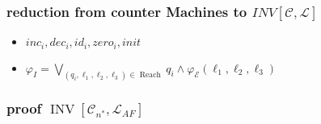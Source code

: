 \begin{frame}
    \frametitle{reduction from counter Machines to $INV[\mathcal{C},\mathcal{L}]$}
    \begin{itemize}
        \item $inc_i, dec_i, id_i, zero_i, init$
        \item $\varphi_{I}=\bigvee_{\left(q_{i}, \ell_{1}, \ell_{2}, \ell_{3}\right) \in \text { Reach }} q_{i} \wedge \varphi_{\mathcal{E}}\left(\ell_{1}, \ell_{2}, \ell_{3}\right) $
    \end{itemize}
\end{frame}
\begin{frame}
    \frametitle{proof $\operatorname{INV}\left[\mathcal{C}_{n^{*}}, \mathcal{L}_{A F}\right]$}
    \begin{itemize}
        
    \end{itemize}
\end{frame}
